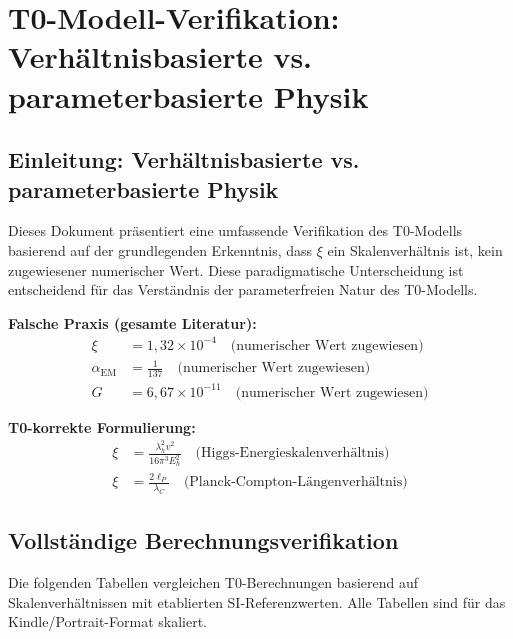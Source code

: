
	\chapter{T0-Modell-Verifikation: Verhältnisbasierte vs. parameterbasierte Physik}
	
	\section{Einleitung: Verhältnisbasierte vs. parameterbasierte Physik}
	
	Dieses Dokument präsentiert eine umfassende Verifikation des T0-Modells basierend auf der grundlegenden Erkenntnis, dass $\xi$ ein Skalenverhältnis ist, kein zugewiesener numerischer Wert. Diese paradigmatische Unterscheidung ist entscheidend für das Verständnis der parameterfreien Natur des T0-Modells.
	
	\begin{tcolorbox}[colback=red!5!white,colframe=red!75!black,title=Grundlegender Literaturfehler]
		\textbf{Falsche Praxis (gesamte Literatur):}
		\begin{align}
			\xi &= 1,32 \times 10^{-4} \quad \text{(numerischer Wert zugewiesen)} \\
			\alpha_{\text{EM}} &= \frac{1}{137} \quad \text{(numerischer Wert zugewiesen)} \\
			G &= 6,67 \times 10^{-11} \quad \text{(numerischer Wert zugewiesen)}
		\end{align}
		
		\textbf{T0-korrekte Formulierung:}
		\begin{align}
			\xi &= \frac{\lambda_h^2 v^2}{16\pi^3 E_h^2} \quad \text{(Higgs-Energieskalenverhältnis)} \\
			\xi &= \frac{2\ell_P}{\lambda_C} \quad \text{(Planck-Compton-Längenverhältnis)}
		\end{align}
	\end{tcolorbox}
	
	\section{Vollständige Berechnungsverifikation}
	
	Die folgenden Tabellen vergleichen T0-Berechnungen basierend auf Skalenverhältnissen mit etablierten SI-Referenzwerten. Alle Tabellen sind für das Kindle/Portrait-Format skaliert.
	
